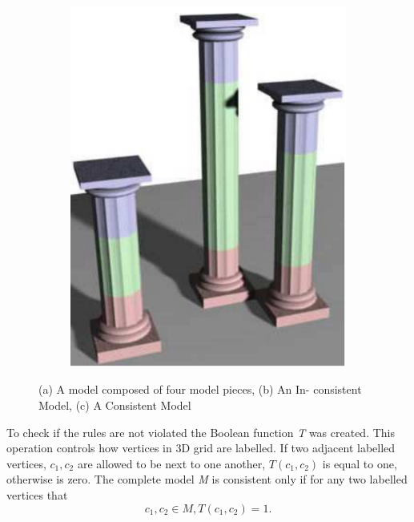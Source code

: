 \documentclass[b5paper,twoside,11pt]{article}
\begin{document}
\begin{figure}[!h]
\begin{subfigure}[b]{0.3\textwidth}
		\includegraphics[width=\textwidth]{1c}
		\caption{}
		\label{fig:1c}
	\end{subfigure}
	\caption{ (a) A model composed of four model pieces, (b) An In-
		consistent Model, (c) A Consistent Model}\label{fig:animals}
\end{figure}

To check if the rules are not violated the Boolean function \textit{T} was created. This operation controls how vertices in 3D grid are labelled. If two adjacent labelled vertices, $c_1 , c_2$ are allowed to be next to one another, $T(c_1,c_2) $ is equal to one, otherwise is zero. The complete model \textit{M} is consistent only if for any two labelled vertices that 
\begin{equation}
c_1,c_2 \in M, T(c_1,c_2)=1.
\end{equation}
\end{document}
